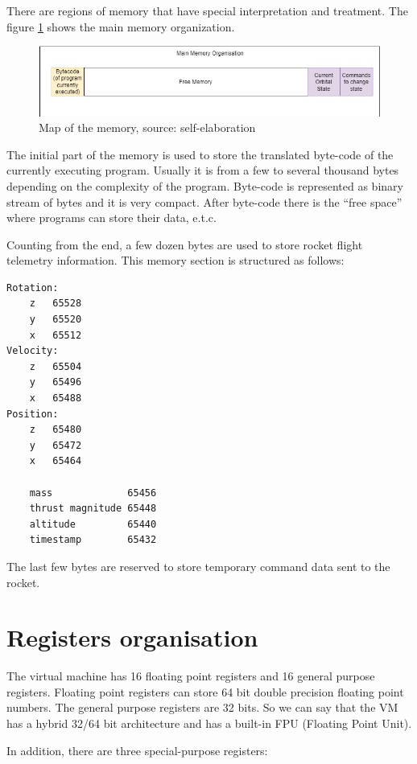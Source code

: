 \documentclass[oneside]{book}
\begin{document}
There are regions of memory that have special interpretation and treatment. The figure \ref{fig:vm_memory_map} shows the main memory organization.

\begin{figure}[H]
    \centering
    \includegraphics[width=1.0\textwidth]{Images/MemoryOrganisation.jpg}
    \caption{Map of the memory, source: self-elaboration}
    \label{fig:vm_memory_map}
\end{figure}

\noindent
The initial part of the memory is used to store the translated byte-code of the currently executing program. Usually it is from a few to several thousand bytes depending on the complexity of the program. Byte-code is represented as binary stream of bytes and it is very compact.
After byte-code there is the ``free space'' where programs can store their data, e.t.c.

Counting from the end, a few dozen bytes are used to store rocket flight telemetry information. This memory section is structured as follows:

\begin{lstlisting}
Rotation:
	z	65528
	y	65520
	x	65512
Velocity:	
	z	65504
	y	65496
	x	65488
Position:	
	z	65480
	y	65472
	x	65464
	
	mass	         65456
	thrust magnitude 65448
	altitude         65440
	timestamp        65432
\end{lstlisting}

\noindent 
The last few bytes are reserved to store temporary command data sent to the rocket.

\section{Registers organisation}

The virtual machine has 16 floating point registers and 16 general purpose registers. Floating point registers can store 64 bit double precision floating point numbers. The general purpose registers are 32 bits. So we can say that the VM has a hybrid 32/64 bit architecture and has a built-in FPU (Floating Point Unit).

In addition, there are three special-purpose registers:
\end{document}
